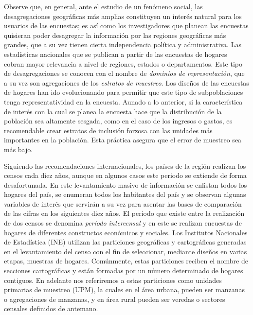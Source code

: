 \documentclass[
  12pt,
]{book}
\begin{document}
Observe que, en general, ante el estudio de un fenómeno social, las desagregaciones geográficas más amplias constituyen un interés natural para los usuarios de las encuestas; es así como los investigadores que planean las encuestas quisieran poder desagregar la información por las regiones geográficas más grandes, que a su vez tienen cierta independencia política y administrativa. Las estadísticas nacionales que se publican a partir de las encuestas de hogares cobran mayor relevancia a nivel de regiones, estados o departamentos. Este tipo de desagregaciones se conocen con el nombre de \emph{dominios de representación}, que a su vez son agregaciones de los \emph{estratos de muestreo}. Los diseños de las encuestas de hogares han ido evolucionando para permitir que este tipo de subpoblaciones tenga representatividad en la encuesta. Aunado a lo anterior, si la característica de interés con la cual se planea la encuesta hace que la distribución de la población sea altamente sesgada, como en el caso de los ingresos o gastos, es recomendable crear estratos de inclusión forzosa con las unidades más importantes en la población. Esta práctica asegura que el error de muestreo sea más bajo.

Siguiendo las recomendaciones internacionales, los países de la región realizan los censos cada diez años, aunque en algunos casos este periodo se extiende de forma desafortunada. En este levantamiento masivo de información se enlistan todos los hogares del país, se enumeran todos los habitantes del país y se observan algunas variables de interés que servirán a su vez para asentar las bases de comparación de las cifras en los siguientes diez años. El periodo que existe entre la realización de dos censos se denomina \emph{periodo intercensal} y en este se realizan encuestas de hogares de diferentes constructos económicos y sociales. Los Institutos Nacionales de Estadística (INE) utilizan las particiones geográficas y cartográficas generadas en el levantamiento del censo con el fin de seleccionar, mediante diseños en varias etapas, muestras de hogares. Comúnmente, estas particiones reciben el nombre de secciones cartográficas y están formadas por un número determinado de hogares contiguos. En adelante nos referiremos a estas particiones como unidades primarias de muestreo (UPM), la cuales en el área urbana, pueden ser manzanas o agregaciones de manzanas, y en área rural pueden ser veredas o sectores censales definidos de antemano.
\end{document}
